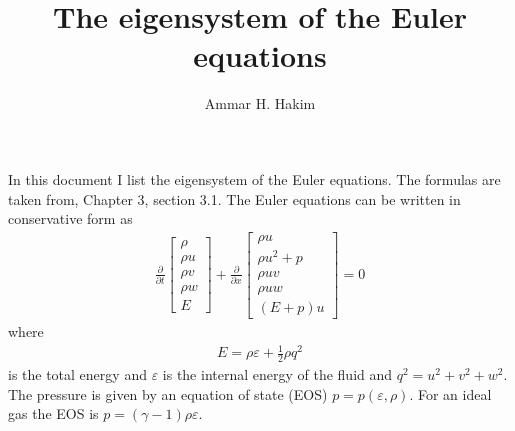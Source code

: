 \documentclass[11pt, reqno]{amsart}
\title[Euler Eigensystem]{The eigensystem of the Euler equations}%
\author{Ammar H. Hakim}%
\date{}
\newcommand{\pfraca}[1]{\frac{\partial}{\partial #1}}
\theoremstyle{definition}
\begin{document}
\maketitle

In this document I list the eigensystem of the Euler equations. The
formulas are taken from\cite{kulikovskii_2001}, Chapter 3, section
3.1. The Euler equations can be written in conservative form as
\begin{align}
  \pfraca{t}
  \left[
    \begin{matrix}
      \rho \\
      \rho u \\
      \rho v \\
      \rho w \\
      E
    \end{matrix}
  \right]
  +
  \pfraca{x}
  \left[
    \begin{matrix}
      \rho u \\
      \rho u^2 + p \\
      \rho uv \\
      \rho uw \\
      (E+p)u
    \end{matrix}
  \right]
  =
  0
\end{align}
where
\begin{align}
  E = \rho \varepsilon + \frac{1}{2}\rho q^2
\end{align}
is the total energy and $\varepsilon$ is the internal energy of the
fluid and $q^2=u^2 + v^2 + w^2$. The pressure is given by an equation
of state (EOS) $p=p(\varepsilon, \rho)$. For an ideal gas the EOS is
$p = (\gamma-1)\rho \varepsilon$.
\end{document}
